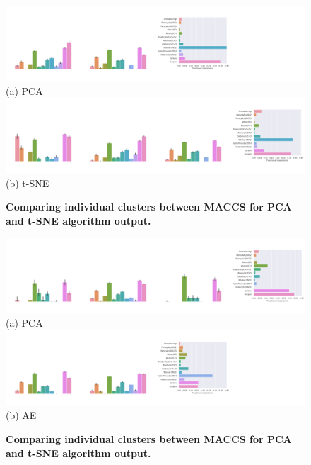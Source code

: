 \begin{landscape}
\begin{figure}[H]
    \centering
         \includegraphics[width=1.35\textheight]{./outputs/PCA/maccs/group.png}
         \\ (a) PCA \\
     \hfill
            \includegraphics[width=1.35\textheight]{./outputs/t-SNE/maccs/group.png}
        \\ (b) t-SNE
        \caption{ \textbf{Comparing individual clusters between MACCS for PCA and t-SNE algorithm output.} }
        \label{fig:biMACCS}
\end{figure}
\end{landscape}



\begin{landscape}
\begin{figure}[H]
    \centering
         \includegraphics[width=1.35\textheight]{./outputs/PCA/node2vec/group.png}
         \\ (a) PCA \\
     \hfill
            \includegraphics[width=1.35\textheight]{./outputs/AE/node2vec/group.png}
        \\ (b) AE
        \caption{ \textbf{Comparing individual clusters between MACCS for PCA and t-SNE algorithm output.} }
        \label{fig:biMACCS}
\end{figure}
\end{landscape}




